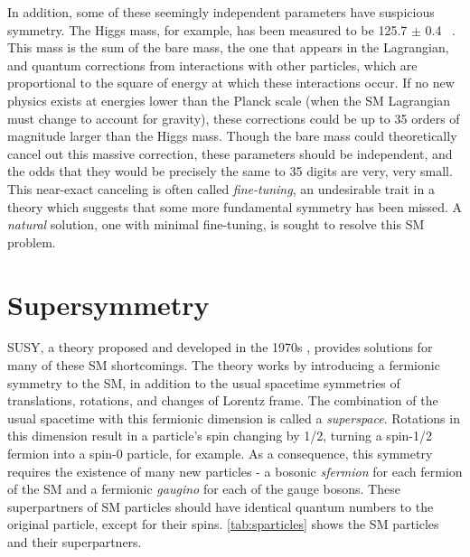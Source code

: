 In addition, some of these seemingly independent parameters have suspicious symmetry. The Higgs mass, for example, has been measured to be 125.7 $\pm$ 0.4 \gev~\cite{Agashe:2014kda}. This mass is the sum of the bare mass, the one that appears in the Lagrangian, and quantum corrections from interactions with other particles, which are proportional to the square of energy at which these interactions occur. If no new physics exists at energies lower than the Planck scale (when the \ac{SM} Lagrangian must change to account for gravity), these corrections could be up to 35 orders of magnitude larger than the Higgs mass. Though the bare mass could theoretically cancel out this massive correction, these parameters should be independent, and the odds that they would be precisely the same to 35 digits are very, very small. This near-exact canceling is often called \textit{fine-tuning}, an undesirable trait in a theory which suggests that some more fundamental symmetry has been missed. A \textit{natural} solution, one with minimal fine-tuning, is sought to resolve this \ac{SM} problem. 


\section{Supersymmetry}

\acf{SUSY}, a theory proposed and developed in the 1970s \cite{WESS197439, 1971NuPhB..34..632G, 1971PhRvD...3.2415R}, provides solutions for many of these \ac{SM} shortcomings. The theory works by introducing a fermionic symmetry to the \ac{SM}, in addition to the usual spacetime symmetries of translations, rotations, and changes of Lorentz frame. The combination of the usual spacetime with this fermionic dimension is called a \textit{superspace}. Rotations in this dimension result in a particle's spin changing by 1/2, turning a spin-1/2 fermion into a spin-0 particle, for example. As a consequence, this symmetry requires the existence of many new particles - a bosonic \textit{sfermion} for each fermion of the \ac{SM} and a fermionic \textit{gaugino} for each of the gauge bosons. These superpartners of \ac{SM} particles should have identical quantum numbers to the original particle, except for their spins. \autoref{tab:sparticles} shows the \ac{SM} particles and their superpartners. 


